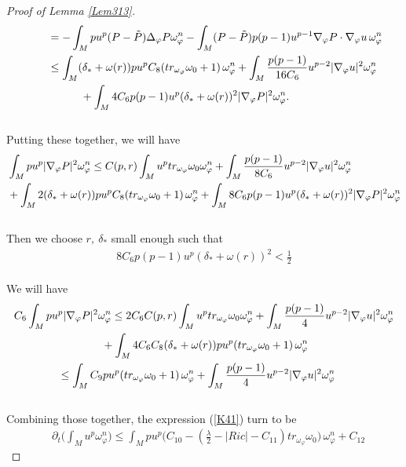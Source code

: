 \documentclass[11pt]{amsart}
\numberwithin{equation}{section}
\begin{document}
\begin{proof}[Proof of Lemma \ref{Lem313}]
\begin{align}
	&\qquad =-\int_M pu^p(P-\tilde P)\Delta_\varphi P \omega_{\varphi}^n -\int_M (P-\tilde P)p(p-1)u^{p-1} \nabla_\varphi P\cdot\nabla_\varphi u\, \omega_\varphi^n           \notag\\
	&\qquad \le  \int_M (\delta_* + \omega(r))pu^p C_{8}(tr_{\omega_{\varphi}}\omega_0+1)\,\omega_\varphi^n +  \int_M  \frac{p(p-1)}{16C_6} u^{p-2} |\nabla_{\varphi} u|^2 \omega_{\varphi}^n \notag\\
	&\qquad\qquad \quad  + \int_M 4C_6 p(p-1) u^p (\delta_* + \omega(r))^2 |\nabla_{\varphi} P|^2 \omega_{\varphi}^n.
\end{align}\\
Putting these together, we will have
\begin{align}
	& \int_M p u^p |\nabla_{\varphi} P|^2 \omega_{\varphi}^n \le  C(p,r) \int_M  u^p tr_{\omega_{\varphi}} \omega_0 \omega_{\varphi}^n +\int_M  \frac{p(p-1)}{8C_6} u^{p-2} |\nabla_{\varphi} u|^2 \omega_{\varphi}^n  \notag\\
	& +  \int_M 2(\delta_* + \omega(r))pu^p C_{8}(tr_{\omega_{\varphi}}\omega_0+1)\,\omega_\varphi^n  + \int_M 8C_6 p(p-1) u^p (\delta_* + \omega(r))^2 |\nabla_{\varphi} P|^2 \omega_{\varphi}^n
\end{align}\\
Then we choose $r,\ \delta_*$ small enough such that 
\begin{align}
	8C_6 p(p-1) u^p (\delta_* + \omega(r))^2 <\frac{1}{2}
\end{align}\\
We will have 
\begin{align}
	& C_6 \int_M p u^p |\nabla_{\varphi} P|^2 \omega_{\varphi}^n \le  2C_6 C(p,r) \int_M  u^p tr_{\omega_{\varphi} }\omega_0 \omega_{\varphi}^n +\int_M  \frac{p(p-1)}{4} u^{p-2} |\nabla_{\varphi} u|^2 \omega_{\varphi}^n  \notag\\
	&\qquad\qquad\qquad\qquad + \int_M 4C_6 C_{8}(\delta_* + \omega(r))pu^p (tr_{\omega_{\varphi}}\omega_0+1)\,\omega_\varphi^n   \notag\\
	&\qquad\qquad \le   \int_M C_{9}pu^p (tr_{\omega_{\varphi}}\omega_0+1)\,\omega_\varphi^n   +\int_M  \frac{p(p-1)}{4} u^{p-2} |\nabla_{\varphi} u|^2 \omega_{\varphi}^n 
\end{align}\\
Combining those together, the expression (\ref{K41}) turn to be
\begin{align}
	&\partial_t\big( \int_M u^p\omega_\varphi^n\big)\le  \int_M pu^p \bigg(C_{10} - (\frac{\lambda}{2}-|Ric|-C_{11})tr_{\omega_{\varphi}}\omega_0 \bigg)\,\omega_\varphi^n +C_{12} 

\end{align}
\end{proof}
\end{document}
